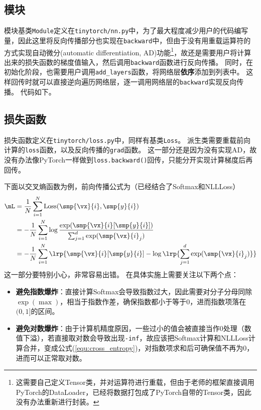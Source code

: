 \documentclass[logo,reportComp]{thesis}
\begin{document}
\subsection{模块}
模块基类\verb'Module'定义在\verb'tinytorch/nn.py'中，为了最大程度减少用户的代码编写量，因此这里将反向传播部分也实现在\verb'backward'中，但由于没有用重载运算符的方式实现自动微分(automatic differentiation, AD)功能\footnote{这需要自己定义Tensor类，并对运算符进行重载，但由于老师的框架直接调用PyTorch的DataLoader，已经将数据打包成了PyTorch自带的Tensor类，因此没有办法重新进行封装。}，故还是需要用户将计算出来的损失函数的梯度值输入，然后调用\verb'backward'函数进行反向传播。
同时，在初始化阶段，也需要用户调用\verb'add_layers'函数，将网络层\textbf{依序}添加到列表中。
这样回传时就可以直接逆向遍历网络层，逐一调用网络层的\verb'backward'实现反向传播。
代码如下。


\subsection{损失函数}
损失函数定义在\verb'tinytorch/loss.py'中，同样有基类\verb'Loss'。
派生类需要重载前向计算的\verb'loss'函数，以及反向传播的\verb'grad'函数。
这一部分还是因为没有实现AD，故没有办法像PyTorch一样做到\verb'loss.backward()'回传，只能分开实现计算梯度后再回传。

下面以交叉熵函数为例，前向传播公式为（已经结合了Softmax和NLLLoss）
\begin{align}
\mL&=\frac{1}{N}\sum_{i=1}^N\mathrm{Loss}(\smp{\vx}{i},\smp{y}{i})\\
&=-\frac{1}{N}\sum_{i=1}^N\log\frac{\exp(\smp{\vx}{i}[\smp{y}{i}])}{\sum_{j=1}^d\exp(\smp{\vx}{i}_j)}\\
&=-\frac{1}{N}\sum_{i=1}^N\lrp{\smp{\vx}{i}[\smp{y}{i}]-\log\lrp{\sum_{j=1}^d\exp(\smp{\vx}{i}_j)}}
\label{equ:cross_entropy}
\end{align}
这一部分要特别小心，非常容易出错。
在具体实施上需要关注以下两个点：
\begin{itemize}
	\item \textbf{避免指数爆炸}：直接计算Softmax会导致指数过大，因此需要对分子分母同除$\exp(\max)$，相当于指数作差，确保指数都小于等于$0$，进而指数项落在$(0,1]$的区间。
	\item \textbf{避免对数爆炸}：由于计算机精度原因，一些过小的值会被直接当作$0$处理（数值下溢），若直接取对数会导致出现\verb'-inf'，故应该把Softmax计算和NLLLoss计算合并，变成公式(\ref{equ:cross_entropy})，对指数项求和后可确保值不再为$0$，进而可以正常取对数。
\end{itemize}
\end{document}
